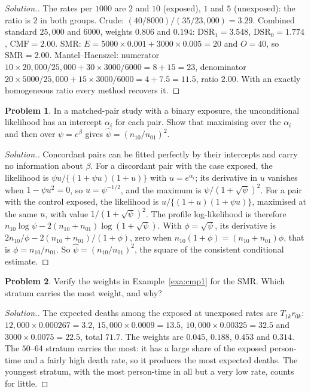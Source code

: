 \documentclass[11pt,a4paper]{article}
\numberwithin{equation}{section}
\theoremstyle{definition}
\newtheorem{problemx}{Problem}[subsection]
\newenvironment{problem}{\begin{problemx}}{\end{problemx}}
\newenvironment{solution}
  {\renewcommand{\qedsymbol}{}\begin{proof}[\textit{Solution}.]}
  {\end{proof}}
\begin{document}
\begin{solution}
The rates per $1000$ are $2$ and $10$ (exposed), $1$ and $5$ (unexposed): the ratio is $2$ in both groups. Crude: $(40/8000)/(35/23{,}000) = 3.29$. Combined
standard $25{,}000$ and $6000$, weights $0.806$ and $0.194$: $\text{DSR}_1 = 3.548$, $\text{DSR}_0 = 1.774$, $\text{CMF} = 2.00$. SMR: $E = 5000 \times 0.001 + 3000 \times 0.005 = 20$ and $O = 40$,
so $\text{SMR} = 2.00$. Mantel--Haenszel: numerator $10 \times 20{,}000/25{,}000 + 30 \times 3000/6000 = 8 + 15 = 23$, denominator $20 \times 5000/25{,}000 + 15 \times 3000/6000 = 4 + 7.5 = 11.5$, ratio
$2.00$. With an exactly homogeneous ratio every method recovers it.
\end{solution}

\begin{problem}
\label{prob:uml}
In a matched-pair study with a binary exposure, the unconditional likelihood has an intercept $\alpha_i$ for each pair. Show that maximising over
the $\alpha_i$ and then over $\psi = e^\beta$ gives $\hat\psi = (n_{10}/n_{01})^2$.
\end{problem}

\begin{solution}
Concordant pairs can be fitted perfectly by their intercepts and carry no information about $\beta$. For a discordant pair with the case
exposed, the likelihood is $\psi u/\{(1 + \psi u)(1 + u)\}$ with $u = e^{\alpha_i}$; its derivative in $u$ vanishes when $1 - \psi u^2 = 0$, so $u = \psi^{-1/2}$, and the maximum is
$\psi/(1 + \sqrt\psi)^2$. For a pair with the control exposed, the likelihood is $u/\{(1 + u)(1 + \psi u)\}$, maximised at the same $u$, with value $1/(1 + \sqrt\psi)^2$. The
profile log-likelihood is therefore $n_{10}\log\psi - 2(n_{10} + n_{01})\log(1 + \sqrt\psi)$. With $\phi = \sqrt\psi$, its derivative is
$2n_{10}/\phi - 2(n_{10} + n_{01})/(1 + \phi)$, zero when $n_{10}(1 + \phi) = (n_{10} + n_{01})\phi$, that is $\phi = n_{10}/n_{01}$. So $\hat\psi = (n_{10}/n_{01})^2$, the square of the consistent
conditional estimate.
\end{solution}

\begin{problem}
Verify the weights in Example~\ref{exa:cmp1} for the SMR. Which stratum carries the most weight, and why?
\end{problem}

\begin{solution}
The expected deaths among the exposed at unexposed rates are $T_{1k}r_{0k}$: $12{,}000 \times 0.000267 = 3.2$, $15{,}000 \times 0.0009 = 13.5$, $10{,}000 \times 0.00325 = 32.5$ and
$3000 \times 0.0075 = 22.5$, total $71.7$. The weights are $0.045$, $0.188$, $0.453$ and $0.314$. The $50$--$64$ stratum carries the most: it has a large share of the
exposed person-time and a fairly high death rate, so it produces the most expected deaths. The youngest stratum, with the most person-time
in all but a very low rate, counts for little.
\end{solution}
\end{document}
